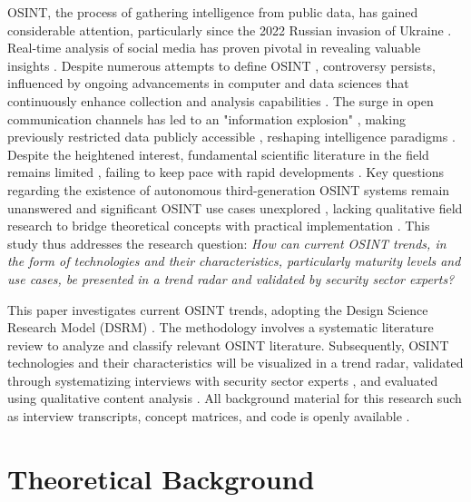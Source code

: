 \documentclass[10pt]{article}
\begin{document}
OSINT, the process of gathering intelligence from public data, has gained considerable attention, particularly since
the 2022 Russian invasion of Ukraine \cite{DosPassos.2017}. Real-time analysis of social media has proven pivotal in revealing
valuable insights \cite{SmithBoyle.24.07.2023}. Despite numerous attempts to define OSINT
\cite{Hwang.2022, PastorGalindo.2020, Yogish.2021}, controversy persists, influenced by ongoing advancements in computer and
data sciences that continuously enhance collection and analysis capabilities \cite{Ghioni.2023, Williams.2018}.
The surge in open communication channels has led to an "information explosion" \cite{DosPassos.2017, Hwang.2022, Yogish.2021},
making previously restricted data publicly accessible \cite{Hwang.2022, Williams.2018}, reshaping intelligence paradigms \cite{Dokman.2020}.
Despite the heightened interest, fundamental scientific literature in the field remains limited \cite{HerreraCubides.2020},
failing to keep pace with rapid developments \cite{Ghioni.2023, Williams.2018}. Key questions regarding the existence of
autonomous third-generation OSINT systems \cite{PastorGalindo.2019, PastorGalindo.2020} remain unanswered
\cite{Ghioni.2023, PastorGalindo.2020, Yogish.2021} and significant OSINT use cases unexplored
\cite{AlKilani.2021, Dokman.2020, Ghioni.2023}, lacking qualitative field research to bridge theoretical concepts with
practical implementation \cite{HerreraCubides.2020, PastorGalindo.2019}. This study thus addresses the research question:
\textit{How can current OSINT trends, in the form of technologies and their characteristics, particularly maturity levels and use cases, be presented in a trend radar and validated by security sector experts?}


This paper investigates current OSINT trends, adopting the Design Science Research Model (DSRM) \cite{Peffers.2007}.
The methodology involves a systematic literature review \cite{Webster.2002} to analyze and classify relevant OSINT literature.
Subsequently, OSINT technologies and their characteristics will be visualized in a trend radar, validated through systematizing
interviews with security sector experts \cite{Bogner.2014}, and evaluated using qualitative content analysis \cite{Billings.1997}. All background material for this research such as interview transcripts, concept matrices, and code is openly available \cite{kayser2024}.


\section{Theoretical Background} \label{sec:theoreticalbackground}
\end{document}

